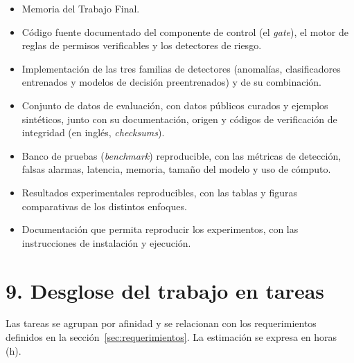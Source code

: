 \documentclass[
11pt, %
]{charter}
\begin{document}
\begin{itemize}
	\item Memoria del Trabajo Final.
	\item Código fuente documentado del componente de control (el \textit{gate}), el motor de reglas de permisos verificables y los detectores de riesgo.
	\item Implementación de las tres familias de detectores (anomalías, clasificadores entrenados y modelos de decisión preentrenados) y de su combinación.
	\item Conjunto de datos de evaluación, con datos públicos curados y ejemplos sintéticos, junto con su documentación, origen y códigos de verificación de integridad (en inglés, \textit{checksums}).
	\item Banco de pruebas (\textit{benchmark}) reproducible, con las métricas de detección, falsas alarmas, latencia, memoria, tamaño del modelo y uso de cómputo.
	\item Resultados experimentales reproducibles, con las tablas y figuras comparativas de los distintos enfoques.
	\item Documentación que permita reproducir los experimentos, con las instrucciones de instalación y ejecución.
\end{itemize}

\section{9. Desglose del trabajo en tareas}
\label{sec:wbs}

Las tareas se agrupan por afinidad y se relacionan con los requerimientos definidos en la sección~\ref{sec:requerimientos}. La estimación se expresa en horas (h).
\end{document}
